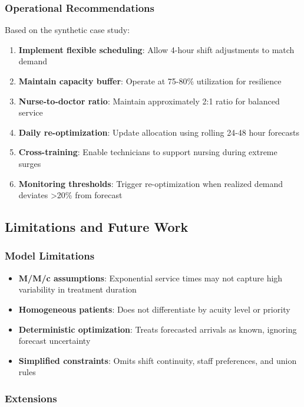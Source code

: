 \documentclass[12pt,a4paper]{article}
\begin{document}
	\subsubsection{Operational Recommendations}
	
	Based on the synthetic case study:
	
	\begin{enumerate}
		\item \textbf{Implement flexible scheduling}: Allow 4-hour shift adjustments to match demand
		\item \textbf{Maintain capacity buffer}: Operate at 75-80\% utilization for resilience
		\item \textbf{Nurse-to-doctor ratio}: Maintain approximately 2:1 ratio for balanced service
		\item \textbf{Daily re-optimization}: Update allocation using rolling 24-48 hour forecasts
		\item \textbf{Cross-training}: Enable technicians to support nursing during extreme surges
		\item \textbf{Monitoring thresholds}: Trigger re-optimization when realized demand deviates >20\% from forecast
	\end{enumerate}
	
	\subsection{Limitations and Future Work}
	
	\subsubsection{Model Limitations}
	
	\begin{itemize}
		\item \textbf{M/M/c assumptions}: Exponential service times may not capture high variability in treatment duration
		\item \textbf{Homogeneous patients}: Does not differentiate by acuity level or priority
		\item \textbf{Deterministic optimization}: Treats forecasted arrivals as known, ignoring forecast uncertainty
		\item \textbf{Simplified constraints}: Omits shift continuity, staff preferences, and union rules
	\end{itemize}
	
	\subsubsection{Extensions}
	
\end{document}
